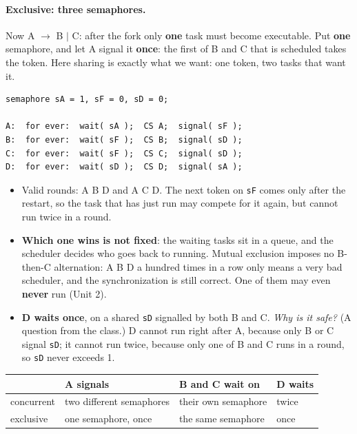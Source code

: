 \paragraph{Exclusive: three semaphores.} Now A $\rightarrow$ B $|$ C: after the fork only \textbf{one} task must become executable. Put \textbf{one} semaphore, and let A signal it \textbf{once}: the first of B and C that is scheduled takes the token. Here sharing is exactly what we want: one token, two tasks that want it.
\begin{lstlisting}[basicstyle=\ttfamily\footnotesize]
semaphore sA = 1, sF = 0, sD = 0;

A:  for ever:  wait( sA );  CS A;  signal( sF );
B:  for ever:  wait( sF );  CS B;  signal( sD );
C:  for ever:  wait( sF );  CS C;  signal( sD );
D:  for ever:  wait( sD );  CS D;  signal( sA );
\end{lstlisting}
\begin{itemize}
    \item Valid rounds: A B D and A C D. The next token on \texttt{sF} comes only after the restart, so the task that has just run may compete for it again, but cannot run twice in a round.
    \item \textbf{Which one wins is not fixed}: the waiting tasks sit in a queue, and the scheduler decides who goes back to running. Mutual exclusion imposes no B-then-C alternation: A B D a hundred times in a row only means a very bad scheduler, and the synchronization is still correct. One of them may even \textbf{never} run (Unit 2).
    \item \textbf{D waits once}, on a shared \texttt{sD} signalled by both B and C. \emph{Why is it safe?} (A question from the class.) D cannot run right after A, because only B or C signal \texttt{sD}; it cannot run twice, because only one of B and C runs in a round, so \texttt{sD} never exceeds 1.
\end{itemize}
\begin{center}
\small
\begin{tabular}{l P{0.27} P{0.27} P{0.15}}
    \hline
    & \textbf{A signals} & \textbf{B and C wait on} & \textbf{D waits} \\
    \hline
    concurrent & two different semaphores & their own semaphore & twice \\
    exclusive & one semaphore, once & the same semaphore & once \\
    \hline
\end{tabular}
\end{center}

